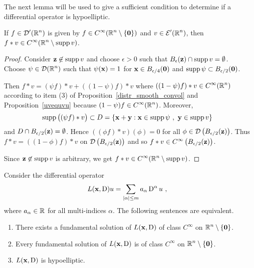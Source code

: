The next lemma will be used to give a sufficient condition to
determine if a differential operator is hypoelliptic.

\begin{lemma} \label{distr_lemma_hypo}
If $\displaystyle f \in \mathcal{D}'(\mathbb{R}^n)$ is given by
$\displaystyle f\in C^\infty(\mathbb{R}^n\setminus \{\mathbf{0}\})$
and $\displaystyle v \in \mathcal{E}'(\mathbb{R}^n)$, then
$\displaystyle f\ast v \in C^\infty(\mathbb{R}^n\setminus \operatorname{supp} v)$.
\end{lemma}

\begin{proof}
Consider $\mathbf{z} \not\in \operatorname{supp} v$ and choose $\epsilon >0$ such that
$\displaystyle B_\epsilon(\mathbf{z}) \cap \operatorname{supp} v = \emptyset$.
Choose $\displaystyle \psi \in \mathcal{D}(\mathbb{R}^n)$ such that $\psi(\mathbf{x}) = 1$ for
$\displaystyle \mathbf{x} \in B_{\epsilon/4}(\mathbf{0})$ and
$\displaystyle \operatorname{supp} \psi \subset B_{\epsilon/2}(\mathbf{0})$.

Then $f\ast v = (\psi f)\ast v + ( (1-\psi)f) \ast v$ where
$\displaystyle ((1-\psi) f) \ast v \in C^\infty(\mathbb{R}^n)$ according to
item (3) of Proposition~\ref{distr_smooth_convol} and
Proposition~\ref{uvequvu} because
$\displaystyle (1-\psi) f \in C^\infty(\mathbb{R}^n)$.  Moreover,
\[
\operatorname{supp} \big( (\psi f)\ast v\big) \subset D = \left\{ \mathbf{x} + \mathbf{y}
: \mathbf{x} \in \operatorname{supp} \psi \ , \ \mathbf{y} \in \operatorname{supp} v \right\}
\]
and $\displaystyle D \cap B_{\epsilon/2}(\mathbf{z}) = \emptyset$.
Hence $((\phi f)\ast v)(\phi) = 0$ for all
$\displaystyle \phi \in \mathcal{D}\left(B_{\epsilon/2}(\mathbf{z})\right)$.
Thus $\displaystyle f\ast v = ((1-\phi)f) \ast v$ on
$\displaystyle \mathcal{D}\left(B_{\epsilon/2}(\mathbf{z})\right)$ and so
$\displaystyle f\ast v \in C^\infty\left(B_{\epsilon/2}(\mathbf{z})\right)$.

Since $\mathbf{z} \not\in \operatorname{supp} v$ is arbitrary, we get
$\displaystyle f\ast v \in C^\infty(\mathbb{R}^n\setminus \operatorname{supp} v)$.
\end{proof}

\begin{theorem} \label{distr_hypoTH}
Consider the differential operator
\[
L(\mathbf{x},\operatorname{D})u = \sum_{|\alpha|\leq m} a_\alpha \operatorname{D}^\alpha u \ ,
\]
where $a_\alpha \in \mathbb{R}$ for all multi-indices $\alpha$.  The following
sentences are equivalent.
\begin{enumerate}
\item There exists a fundamental solution of $L(\mathbf{x},\operatorname{D})$ of
class $\displaystyle C^\infty$ on $\displaystyle \mathbb{R}^n\setminus \{\mathbf{0}\}$.
\item Every fundamental solution of $L(\mathbf{x},\operatorname{D})$ is of class
$\displaystyle C^\infty$ on $\displaystyle \mathbb{R}^n\setminus \{\mathbf{0}\}$.
\item $L(\mathbf{x},\operatorname{D})$ is hypoelliptic.
\end{enumerate}
\end{theorem}

